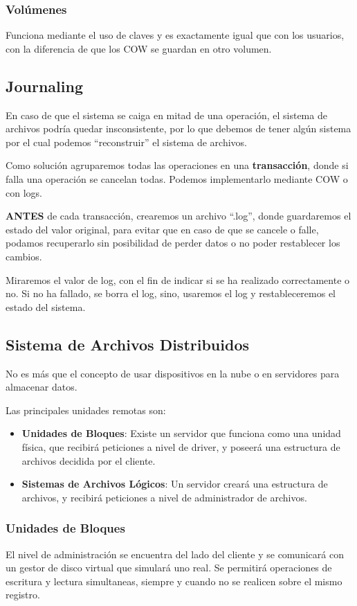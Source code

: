 \subsubsection{Volúmenes}
Funciona mediante el uso de claves y es exactamente igual que con los usuarios, con la diferencia de que los COW se guardan en otro volumen.
\subsection{Journaling}
En caso de que el sistema se caiga en mitad de una operación, el sistema de archivos podría quedar insconsistente, por lo que debemos de tener algún sistema por el cual podemos ``reconstruir'' el sistema de archivos.
\par  Como solución agruparemos todas las operaciones en una \textbf{transacción}, donde si falla una operación se cancelan todas. Podemos implementarlo mediante COW o con logs.
\vspace{.5cm}
\par  \textbf{ANTES} de cada transacción, crearemos un archivo ``.log'', donde guardaremos el estado del valor original, para evitar que en caso de que se cancele o falle, podamos recuperarlo sin posibilidad de perder datos o no poder restablecer los cambios.
\par Miraremos el valor de log, con el fin de indicar si se ha realizado correctamente o no. Si no ha fallado, se borra el log, sino, usaremos el log y restableceremos el estado del sistema.
\subsection{Sistema de Archivos Distribuidos}
No es más que el concepto de usar dispositivos en la nube o en servidores para almacenar datos.
\par  Las principales unidades remotas son:
\begin{itemize}
        \item \textbf{Unidades de Bloques}: Existe un servidor que funciona como una unidad física, que recibirá peticiones a nivel de driver, y poseerá una estructura de archivos decidida por el cliente.
        \item \textbf{Sistemas de Archivos Lógicos}: Un servidor creará una estructura de archivos, y recibirá peticiones a nivel de administrador de archivos.
\end{itemize}
\subsubsection{Unidades de Bloques}
El nivel de administración se encuentra del lado del cliente y se comunicará con un gestor de disco virtual que simulará uno real. Se permitirá operaciones de escritura y lectura simultaneas, siempre y cuando no se realicen sobre el mismo registro.
